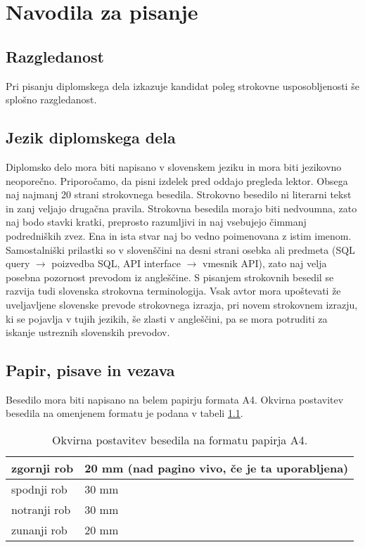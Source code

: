 \documentclass[12pt,a4paper]{book}
\begin{document}
\chapter{Navodila za pisanje}

\section{Razgledanost}
Pri pisanju diplomskega dela izkazuje kandidat poleg strokovne uspo\-sob\-lje\-nos\-ti še splošno razgledanost.

\section{Jezik diplomskega dela}
Diplomsko delo mora biti napisano v slovenskem jeziku in mora biti jezikovno neoporečno. 
Priporočamo, da pisni izdelek pred oddajo pregleda lektor. Obsega naj najmanj 20 strani strokovnega besedila. Stro\-kov\-no besedilo ni
li\-te\-rar\-ni tekst in zanj veljajo drugačna pravila. Stro\-kov\-na besedila morajo biti nedvoumna, zato naj bodo stavki kratki, preprosto
razumljivi in naj vsebujejo čimmanj podredniških zvez. Ena in ista stvar naj bo vedno poimenovana z istim imenom. Samostalniški prilastki so v
slovenščini na desni strani osebka ali predmeta (SQL query $\rightarrow$ poizvedba SQL, API interface $\rightarrow$ vmesnik API), zato naj
velja posebna pozornost prevodom iz angleščine. S pisanjem strokovnih besedil se razvija tudi slovenska strokovna terminologija. Vsak avtor
mora upo\-šte\-va\-ti že uveljavljene slovenske prevode strokovnega izrazja, pri novem stro\-kov\-nem izrazju, ki se pojavlja v tujih jezikih,
še zlasti v angleščini, pa se mora potruditi za iskanje ustreznih slovenskih prevodov. 

\section{Papir, pisave in vezava}
Besedilo mora biti napisano na belem papirju formata A4.
Okvirna postavitev besedila na omenjenem formatu je podana v tabeli \ref{tabela_mere}.

\begin{table}[htb]
\begin{center}
\begin{tabular}{|l|l|}\hline
zgornji rob	 & 20 mm (nad pagino vivo, če je ta uporabljena)\\\hline
spodnji rob	 & 30 mm\\\hline
notranji rob & 30 mm\\\hline
zunanji rob	 & 20 mm\\\hline
\end{tabular}
\end{center}
\caption[Okvirna postavitev besedila.]{Okvirna postavitev besedila na formatu papirja A4.}
\label{tabela_mere}
\end{table}
\end{document}
